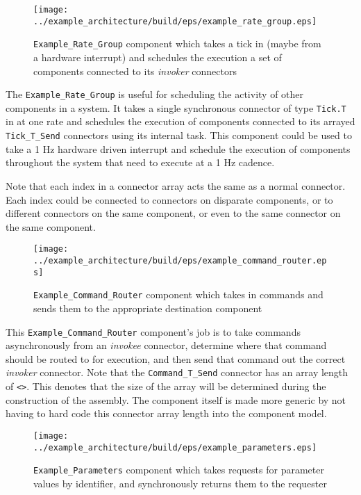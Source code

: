 \begin{figure}[H]
  \texttt{[image: ../example\_architecture/build/eps/example\_rate\_group.eps]}
  \caption{\texttt{Example\_Rate\_Group} component which takes a tick in (maybe from a hardware interrupt) and schedules the execution a set of components connected to its \textit{invoker} connectors}
\end{figure}

The \texttt{Example\_Rate\_Group} is useful for scheduling the activity of other components in a system. It takes a single synchronous connector of type \texttt{Tick.T} in at one rate and schedules the execution of components connected to its arrayed \texttt{Tick\_T\_Send} connectors using its internal task. This component could be used to take a 1 Hz hardware driven interrupt and schedule the execution of components throughout the system that need to execute at a 1 Hz cadence. 

Note that each index in a connector array acts the same as a normal connector. Each index could be connected to connectors on disparate components, or to different connectors on the same component, or even to the same connector on the same component.

\begin{figure}[H]
  \texttt{[image: ../example\_architecture/build/eps/example\_command\_router.eps]}
  \caption{\texttt{Example\_Command\_Router} component which takes in commands and sends them to the appropriate destination component}
\end{figure}

This \texttt{Example\_Command\_Router} component's job is to take commands asynchronously from an \textit{invokee} connector, determine where that command should be routed to for execution, and then send that command out the correct \textit{invoker} connector. Note that the \texttt{Command\_T\_Send} connector has an array length of \texttt{<>}. This denotes that the size of the array will be determined during the construction of the assembly. The component itself is made more generic by not having to hard code this connector array length into the component model.

\begin{figure}[H]
  \texttt{[image: ../example\_architecture/build/eps/example\_parameters.eps]}
  \caption{\texttt{Example\_Parameters} component which takes requests for parameter values by identifier, and synchronously returns them to the requester}
\end{figure}

